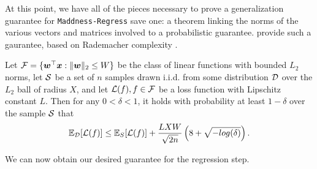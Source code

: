 At this point, we have all of the pieces necessary to prove a generalization guarantee for \texttt{Maddness-Regress} save one: a theorem linking the norms of the various vectors and matrices involved to a probabilistic guarantee. \citet{kakadeLinear} provide such a gaurantee, based on Rademacher complexity \cite{rademacherOrig}.

\begin{theorem} \label{thm:linearGeneralize}
Let $\mathcal{F} = \{\bm{w}^\top \bm{x} : \lVert\bm{w}\rVert_2 \le W \}$ be the class of linear functions with bounded $L_2$ norms, let $\mathcal{S}$ be a set of $n$ samples drawn i.i.d. from some distribution $\mathcal{D}$ over the $L_2$ ball of radius $X$,
and let $\mathcal{L}(f), f \in \mathcal{F}$ be a loss function with Lipschitz constant $L$. Then for any $0 < \delta < 1$, it holds with probability at least $1 - \delta$  over the sample $\mathcal{S}$ that
\begin{align}
    \mathbb{E}_{\mathcal{D}}[\mathcal{L}(f)] \le \mathbb{E}_S[\mathcal{L}(f)] + \frac{L X W}{\sqrt{2n}} \left( 8 + \sqrt{-log(\delta)} \right) .
\end{align}
\end{theorem}

We can now obtain our desired guarantee for the regression step.

